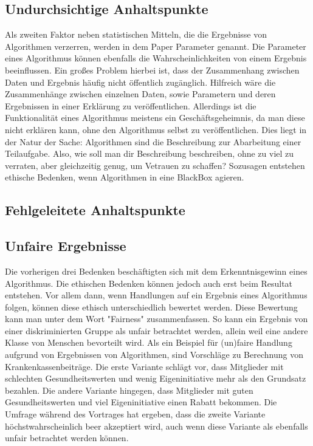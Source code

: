 \subsection{Undurchsichtige Anhaltspunkte}

 Als zweiten Faktor neben statistischen Mitteln, die die Ergebnisse von Algorithmen verzerren, werden in dem Paper Parameter genannt. Die Parameter eines Algorithmus können ebenfalls die Wahrscheinlichkeiten von einem Ergebnis beeinflussen. Ein großes Problem hierbei ist, dass der Zusammenhang zwischen Daten und Ergebnis häufig nicht öffentlich zugänglich. Hilfreich wäre die Zusammenhänge zwischen einzelnen Daten, sowie Parametern und deren Ergebnissen in einer Erklärung zu veröffentlichen. Allerdings ist die Funktionalität eines Algorithmus meistens ein Geschäftsgeheimnis, da man diese nicht erklären kann, ohne den Algorithmus selbst zu veröffentlichen. 
 Dies liegt in der Natur der Sache: Algorithmen sind die Beschreibung zur Abarbeitung einer Teilaufgabe. Also, wie soll man dir Beschreibung beschreiben, ohne zu viel zu verraten, aber gleichzeitig genug, um Vetrauen zu schaffen? 
 Sozusagen entstehen ethische Bedenken, wenn Algorithmen in eine BlackBox agieren. 
 

\subsection{Fehlgeleitete Anhaltspunkte}

\subsection{Unfaire Ergebnisse}

Die vorherigen drei Bedenken beschäftigten sich mit dem Erkenntnisgewinn eines Algorithmus. Die ethischen Bedenken können jedoch auch erst beim Resultat entstehen. Vor allem dann, wenn Handlungen auf ein Ergebnis eines Algorithmus folgen, können diese ethisch unterschiedlich bewertet werden. Diese Bewertung kann man unter dem Wort "Fairness" zusammenfassen. 
So kann ein Ergebnis von einer diskriminierten Gruppe als unfair betrachtet werden, allein weil eine andere Klasse von Menschen bevorteilt wird. 
Als ein Beispiel für (un)faire Handlung aufgrund von Ergebnissen von Algorithmen, sind Vorschläge zu Berechnung von Krankenkassenbeiträge. Die erste Variante schlägt vor, dass Mitglieder mit schlechten Gesundheitswerten und wenig Eigeninitiative mehr als den Grundsatz bezahlen. Die andere Variante hingegen, dass Mitglieder mit guten Gesundheitswerten und viel Eigeninitiative einen Rabatt bekommen. 
Die Umfrage während des Vortrages hat ergeben, dass die zweite Variante höchstwahrscheinlich beer akzeptiert wird, auch wenn diese Variante als ebenfalls unfair betrachtet werden können.


